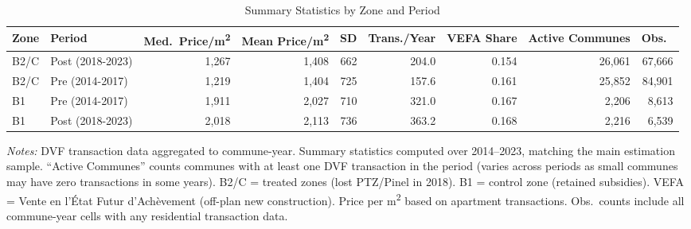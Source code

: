 \begin{table}[htbp]
\centering
\caption{Summary Statistics by Zone and Period}
\label{tab:sumstats}
\begin{adjustbox}{max width=\textwidth}
\begin{tabular}{llrrrrrrr}
\toprule
Zone & Period & Med.\ Price/m\textsuperscript{2} & Mean Price/m\textsuperscript{2} & SD & Trans./Year & VEFA Share & Active Communes & Obs.\ \\
\midrule
B2/C & Post (2018-2023) & 1,267 & 1,408 & 662 & 204.0 & 0.154 & 26,061 & 67,666 \\
B2/C & Pre (2014-2017) & 1,219 & 1,404 & 725 & 157.6 & 0.161 & 25,852 & 84,901 \\
B1 & Pre (2014-2017) & 1,911 & 2,027 & 710 & 321.0 & 0.167 & 2,206 & 8,613 \\
B1 & Post (2018-2023) & 2,018 & 2,113 & 736 & 363.2 & 0.168 & 2,216 & 6,539 \\
\bottomrule
\end{tabular}
\end{adjustbox}
\par\smallskip\noindent\small\textit{Notes:} DVF transaction data aggregated to commune-year. Summary statistics computed over 2014--2023, matching the main estimation sample. ``Active Communes'' counts communes with at least one DVF transaction in the period (varies across periods as small communes may have zero transactions in some years). B2/C = treated zones (lost PTZ/Pinel in 2018). B1 = control zone (retained subsidies). VEFA = Vente en l'\'{E}tat Futur d'Ach\`{e}vement (off-plan new construction). Price per m\textsuperscript{2} based on apartment transactions. Obs.\ counts include all commune-year cells with any residential transaction data.
\end{table}
